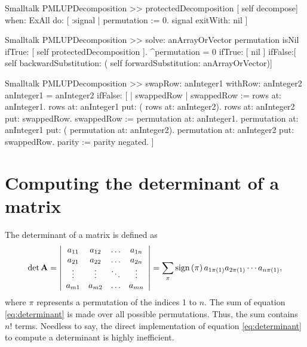 \begin{displaycode}{Smalltalk}
PMLUPDecomposition >> protectedDecomposition
    [ self decompose] when: ExAll do: [ :signal | permutation := 0. 
                                                signal exitWith: nil ]
\end{displaycode}

\begin{displaycode}{Smalltalk}
PMLUPDecomposition >> solve: anArrayOrVector
    permutation isNil
        ifTrue: [ self protectedDecomposition ].
    ^permutation = 0
        ifTrue: [ nil ]
        ifFalse:[ self backwardSubstitution: ( self 
                                forwardSubstitution: anArrayOrVector)] 
\end{displaycode}

\begin{displaycode}{Smalltalk}
PMLUPDecomposition >> swapRow: anInteger1 withRow: anInteger2
    anInteger1 = anInteger2
        ifFalse: [ | swappedRow |
                  swappedRow := rows at: anInteger1.
                  rows at: anInteger1 put: ( rows at: anInteger2).
                  rows at: anInteger2 put: swappedRow.
                  swappedRow := permutation at: anInteger1.
                  permutation at: anInteger1 put: ( permutation at: 
                                                          anInteger2).
                  permutation at: anInteger2 put: swappedRow.
                  parity := parity negated.
                ]
\end{displaycode}

\section{Computing the determinant of a matrix}
\label{sec:determinant} The determinant of a matrix is defined as
\begin{equation}
\label{eq:determinant}
  \det\textbf{A}=\left|
  \begin{array}{cccc}a_{11}& a_{12}&\ldots& a_{1n}\\
  a_{21}& a_{22}&\ldots& a_{2n}\\
  \vdots&\vdots&\ddots&\vdots\\
  a_{m1}& a_{m2}&\ldots& a_{mn}\\ \end{array}
  \right|=\sum_{\pi}\mathop{\textrm{sign}}\left({\pi}\right) a_{1\pi\left(1\right)}a_{2\pi\left(1\right)}
  \cdots a_{n\pi\left(1\right)},
\end{equation}
where $\pi$ represents a permutation of the indices 1 to $n$. The
sum of equation \ref{eq:determinant} is made over all possible
permutations. Thus, the sum contains $n!$ terms. Needless to say,
the direct implementation of equation \ref{eq:determinant} to
compute a determinant is highly inefficient.


